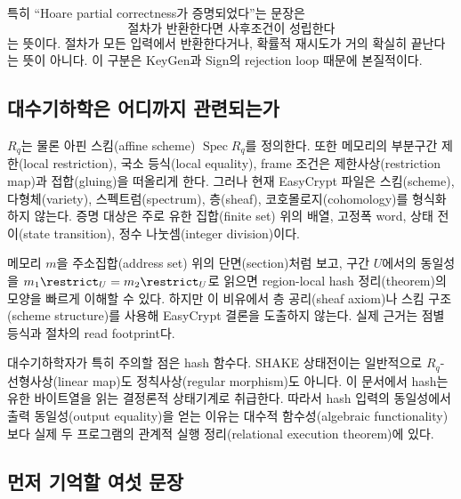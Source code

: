특히 ``Hoare partial correctness가 증명되었다''는 문장은
\[
  \text{절차가 반환한다면 사후조건이 성립한다}
\]
는 뜻이다. 절차가 모든 입력에서 반환한다거나, 확률적 재시도가 거의 확실히
끝난다는 뜻이 아니다. 이 구분은 KeyGen과 Sign의 rejection loop 때문에
본질적이다.

\subsection{대수기하학은 어디까지 관련되는가}

\(R_q\)는 물론 아핀 스킴(affine scheme) \(\operatorname{Spec}R_q\)를
정의한다. 또한 메모리의 부분구간 제한(local restriction), 국소 등식(local
equality), frame 조건은 제한사상(restriction map)과 접합(gluing)을 떠올리게
한다. 그러나 현재 EasyCrypt 파일은 스킴(scheme), 다형체(variety),
스펙트럼(spectrum), 층(sheaf), 코호몰로지(cohomology)를 형식화하지 않는다.
증명 대상은 주로 유한 집합(finite set) 위의 배열, 고정폭 word,
상태 전이(state transition), 정수 나눗셈(integer division)이다.

\begin{analogy}
메모리 \(m\)을 주소집합(address set) 위의 단면(section)처럼 보고, 구간
\(U\)에서의 동일성을
\(m_1\restrict_U=m_2\restrict_U\)로 읽으면 region-local hash 정리(theorem)의 모양을
빠르게 이해할 수 있다. 하지만 이 비유에서 층 공리(sheaf axiom)나
스킴 구조(scheme structure)를 사용해 EasyCrypt 결론을 도출하지 않는다.
실제 근거는 점별 
등식과 절차의 read footprint다.
\end{analogy}

대수기하학자가 특히 주의할 점은 hash 함수다. SHAKE 상태전이는 일반적으로
\(R_q\)-선형사상(linear map)도 정칙사상(regular morphism)도 아니다. 이
문서에서 hash는 유한
바이트열을 읽는 결정론적 상태기계로 취급한다. 따라서 hash 입력의 동일성에서
출력 동일성(output equality)을 얻는 이유는 대수적 함수성(algebraic
functionality)보다 실제 두 프로그램의 관계적 실행 정리(relational execution
theorem)에 있다.

\subsection{먼저 기억할 여섯 문장}


